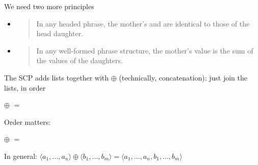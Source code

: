 \documentclass[a4paper,landscape,headrule,footrule]{foils}
\begin{document}

We need two more principles
\begin{itemize}
\item {}
  \begin{quote}
    In any headed phrase, the mother's  and
     are identical to those of the head daughter.
  \end{quote}
\item {}
  \begin{quote}
    In any well-formed phrase structure, the mother's
     value is the sum of the  values of
    the daughters.
  \end{quote}
\end{itemize}


The SCP adds lists together with $\oplus$ (technically, concatenation):
just join the lists, in order

\begin{center}
   $\oplus$  $=$ 
\end{center}

Order matters:
\begin{center}
   $\oplus$  $=$ 
\end{center}

In general:
$\langle a_1, \ldots, a_n \rangle \oplus \langle b_1, \ldots, b_m \rangle =
\langle a_1, \ldots, a_n,  b_1, \ldots, b_m \rangle $

\newcommand{\kimtree}[4]{%
\begin{center}\scalebox{0.75}{\begin{forest}
cat
[{S  \avm{[ sem & [ mode & #1 \\ index & #2 \\ restr & #3 ] ]}}
  [{\avm{\1} NP  \avm{[ sem & [ mode & ref \\ index & $i$\\
      restr & < [reln & {\bf name}\\
      name & \ \ Kim \\ named & \ \ $i$ ] >  ] ]}} [{\eng{Kim}}]]
  [{\HD VP  \avm{[ syn & [ val & [ spr & < \1 > ] ] \\
      sem & [  mode & prop \\ index & $s$ \\
      restr & < [reln & {\bf sleep}\\
      sit & \ \ $s$\\
      sleeper & \ \ $i$  ] > ] ]}} [{\eng{slept}}]]]
\end{forest}}\end{center}
#4}
\end{document}
